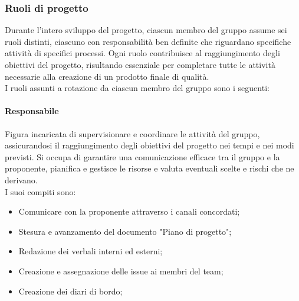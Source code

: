 \documentclass[10pt]{article}
\begin{document}
\begin{justify}
    \subsubsection{Ruoli di progetto}
    Durante l'intero sviluppo del progetto, ciascun membro del gruppo assume sei ruoli distinti, ciascuno con responsabilità ben definite che riguardano specifiche attività di specifici processi.
    Ogni ruolo contribuisce al raggiungimento degli obiettivi del progetto, risultando essenziale per completare tutte le attività necessarie alla creazione di un prodotto finale di qualità.\\
    I ruoli assunti a rotazione da ciascun membro del gruppo sono i seguenti:

        \paragraph{Responsabile}
        Figura incaricata di supervisionare e coordinare le attività del gruppo, assicurandosi il raggiungimento degli obiettivi del progetto nei tempi e nei modi previsti. Si occupa di garantire una comunicazione efficace tra il gruppo e la proponente, pianifica e gestisce le risorse e valuta eventuali scelte e rischi che ne derivano.\\
        I suoi compiti sono:
        \begin{itemize}
            \item Comunicare con la proponente attraverso i canali concordati;
            \item Stesura e avanzamento del documento "Piano di progetto";
            \item Redazione dei verbali interni ed esterni;
            \item Creazione e assegnazione delle issue ai membri del team;
            \item Creazione dei diari di bordo;
        \end{itemize}


\end{justify}
\end{document}
